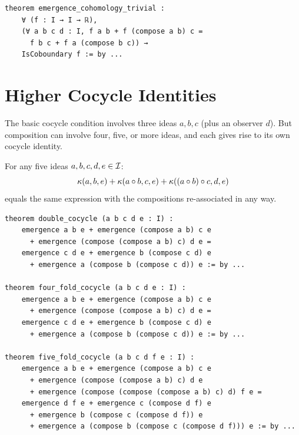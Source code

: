 \begin{lstlisting}[caption={Trivial cohomology (IDT\_v3\_Emergence.lean)}]
theorem emergence_cohomology_trivial :
    ∀ (f : I → I → ℝ),
    (∀ a b c d : I, f a b + f (compose a b) c =
      f b c + f a (compose b c)) →
    IsCoboundary f := by ...
\end{lstlisting}


\section{Higher Cocycle Identities}

The basic cocycle condition involves three ideas $a, b, c$ (plus an observer $d$).
But composition can involve four, five, or more ideas, and each gives rise to its
own cocycle identity.

\begin{theorem}
\label{thm:double-cocycle}
For any five ideas $a, b, c, d, e \in \mathcal{I}$:
\[
  \kappa(a,b,e) + \kappa(a \circ b, c, e) + \kappa((a \circ b) \circ c, d, e)
\]
equals the same expression with the compositions re-associated in any way.
\end{theorem}

\begin{lstlisting}[caption={Higher cocycles (IDT\_v3\_Emergence.lean)}]
theorem double_cocycle (a b c d e : I) :
    emergence a b e + emergence (compose a b) c e
      + emergence (compose (compose a b) c) d e =
    emergence c d e + emergence b (compose c d) e
      + emergence a (compose b (compose c d)) e := by ...

theorem four_fold_cocycle (a b c d e : I) :
    emergence a b e + emergence (compose a b) c e
      + emergence (compose (compose a b) c) d e =
    emergence c d e + emergence b (compose c d) e
      + emergence a (compose b (compose c d)) e := by ...

theorem five_fold_cocycle (a b c d f e : I) :
    emergence a b e + emergence (compose a b) c e
      + emergence (compose (compose a b) c) d e
      + emergence (compose (compose (compose a b) c) d) f e =
    emergence d f e + emergence c (compose d f) e
      + emergence b (compose c (compose d f)) e
      + emergence a (compose b (compose c (compose d f))) e := by ...
\end{lstlisting}

